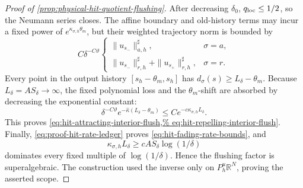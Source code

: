 \begin{proof}[Proof of
\cref{prop:physical-hit-quotient-flushing}]
After decreasing \(\delta_0\), \(q_{\rm loc}\le1/2\), so the Neumann
series closes.  The affine boundary and old-history terms may incur a
fixed power of
\(e^{\kappa_{\sigma,h}\theta_m}\), but their weighted trajectory norm is
bounded by
\[
 C\delta^{-C\vartheta}
 \begin{cases}
  \|u_{s_-}\|_{a,h}^{\sharp},&\sigma=a,\\
  \|u_{s_-}\|_{r,h}^{\sharp}
      +\|u_{s_+}\|_{r,h}^{\sharp},&\sigma=r.
 \end{cases}
\]
Every point in the output history
\([s_h-\theta_m,s_h]\) has
\(d_\sigma(s)\ge L_\delta-\theta_m\).  Because
\(L_\delta=AS_\delta\to\infty\), the fixed polynomial loss and the
\(\theta_m\)-shift are absorbed by decreasing the exponential constant:
\[
 \delta^{-C\vartheta}
 e^{-\widehat\kappa(L_\delta-\theta_m)}
 \le C e^{-c\kappa_{\sigma,h}L_\delta}.
\]
This proves
\cref{eq:hit-attracting-interior-flush,%
eq:hit-repelling-interior-flush}.  Finally,
\cref{eq:proof-hit-rate-ledger} proves
\cref{eq:hit-fading-rate-bounds}, and
\[
 \kappa_{\sigma,h}L_\delta
 \ge cA S_\delta\log(1/\delta)
\]
dominates every fixed multiple of \(\log(1/\delta)\).  Hence the
flushing factor is superalgebraic.  The construction used the inverse only
on \(P_h^u\mathbb R^N\), proving the asserted scope.
\end{proof}


